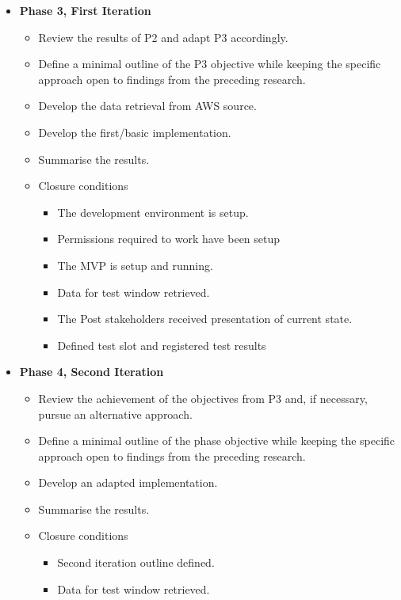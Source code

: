 \begin{itemize}
    \item \textbf{Phase 3, First Iteration}
    \begin{itemize}
        \item Review the results of P2 and adapt P3 accordingly.
        \item Define a minimal outline of the P3 objective while keeping the specific
              approach open to findings from the preceding research.
        \item Develop the data retrieval from AWS source.
        \item Develop the first/basic implementation.
        \item Summarise the results.
        \item Closure conditions
        \begin{itemize}
            \item The development environment is setup.
            \item Permissions required to work have been setup
            \item The MVP is setup and running.
            \item Data for test window retrieved.
            \item The Post stakeholders received presentation of current state.
            \item Defined test slot and registered test results
        \end{itemize}
    \end{itemize}

    \item \textbf{Phase 4, Second Iteration}
    \begin{itemize}
        \item Review the achievement of the objectives from P3 and, if necessary,
              pursue an alternative approach.
        \item Define a minimal outline of the phase objective while keeping the
              specific approach open to findings from the preceding research.
        \item Develop an adapted implementation.
        \item Summarise the results.
        \item Closure conditions
        \begin{itemize}
            \item Second iteration outline defined.
            \item Data for test window retrieved.
        \end{itemize}
    \end{itemize}


\end{itemize}
